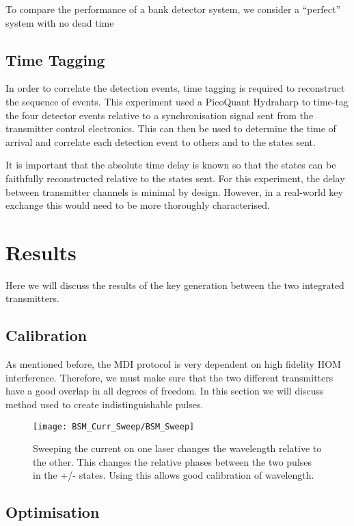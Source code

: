 To compare the performance of a bank detector system, we consider a ``perfect'' system with no dead time

\subsection{Time Tagging}

In order to correlate the detection events, time tagging is required to reconstruct the sequence of events. This experiment used a PicoQuant Hydraharp to time-tag the four detector events relative to a synchronisation signal sent from the transmitter control electronics. This can then be used to determine the time of arrival and correlate each detection event to others and to the states sent.

It is important that the absolute time delay is known so that the states can be faithfully reconstructed relative to the states sent. For this experiment, the delay between transmitter channels is minimal by design. However, in a real-world key exchange this would need to be more thoroughly characterised. 

\section{Results}

Here we will discuss the results of the key generation between the two integrated transmitters.

\subsection{Calibration}

As mentioned before, the \ac{MDI} protocol is very dependent on high fidelity \ac{HOM} interference. Therefore, we must make sure that the two different transmitters have a good overlap in all degrees of freedom. In this section we will discuss method used to create indistinguishable pulses.

\begin{figure}[tbp]
	\centering
	\texttt{[image: BSM\_Curr\_Sweep/BSM\_Sweep]}
	\caption[Laser current-error sweep]{Sweeping the current on one laser changes the wavelength relative to the other. This changes the relative phases between the two pulses in the +/- states. Using this allows good calibration of wavelength.}
	\label{fig:wavelength_cal}
\end{figure}


\subsection{Optimisation}

